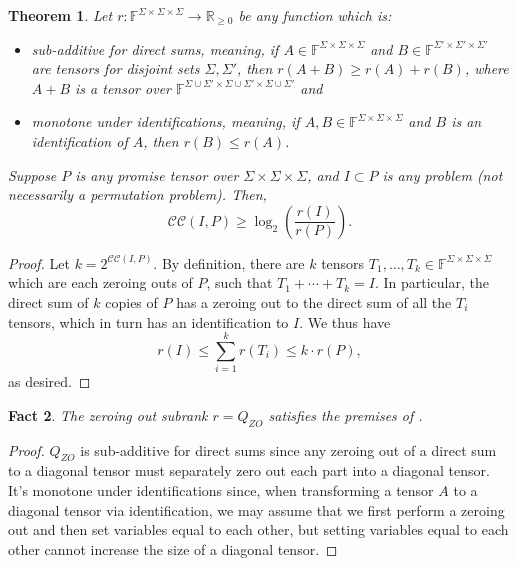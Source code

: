 \documentclass[10pt,a4paper]{article}
\newtheorem{theorem}{Theorem}
\newtheorem{fact}[theorem]{Fact}
\newcommand{\F}{\mathbb{F}}
\newcommand{\cc}{\mathcal{CC}}
\begin{document}
\begin{theorem} \label{thm:asymptspectrum}
Let $r : \F^{\Sigma \times \Sigma \times \Sigma} \to \mathbb{R}_{\geq 0}$ be any function which is:
\begin{itemize}
    \item \emph{sub-additive for direct sums}, meaning, if $A \in \F^{\Sigma \times \Sigma \times \Sigma}$ and $B \in \F^{\Sigma' \times \Sigma' \times \Sigma'}$ are tensors for disjoint sets $\Sigma, \Sigma'$, then $r(A+B) \geq r(A) + r(B)$, where $A+B$ is a tensor over $\F^{\Sigma \cup \Sigma' \times \Sigma \cup \Sigma' \times \Sigma \cup \Sigma'}$ and
    \item \emph{monotone under identifications}, meaning, if  $A,B \in \F^{\Sigma \times \Sigma \times \Sigma}$ and $B$ is an identification of $A$, then $r(B) \leq r(A)$.
\end{itemize}

Suppose $P$ is any promise tensor over $\Sigma \times \Sigma \times \Sigma$, and $I \subset P$ is any problem (not necessarily a permutation problem). Then, $$\cc(I,P) \geq \log_2\left( \frac{r(I)}{r(P)} \right).$$
\end{theorem}


\begin{proof}
   Let $k = 2^{\cc(I,P)}$. By definition, there are $k$ tensors $T_1, \ldots, T_k \in \F^{\Sigma \times \Sigma \times \Sigma}$ which are each zeroing outs of $P$, such that $T_1 + \cdots + T_k = I$. In particular, the direct sum of $k$ copies of $P$ has a zeroing out to the direct sum of all the $T_i$ tensors, which in turn has an identification to $I$. We thus have $$r(I) \leq \sum_{i=1}^k r(T_i) \leq k \cdot r(P),$$
    as desired.
\end{proof}

\begin{fact}
    The zeroing out subrank $r = Q_{ZO}$ satisfies the premises of .
\end{fact}

\begin{proof}
    $Q_{ZO}$ is sub-additive for direct sums since any zeroing out of a direct sum to a diagonal tensor must separately zero out each part into a diagonal tensor. It's monotone under identifications since, when transforming a tensor $A$ to a diagonal tensor via identification, we may assume that we first perform a zeroing out and then set variables equal to each other, but setting variables equal to each other cannot increase the size of a diagonal tensor.
\end{proof}
\end{document}

